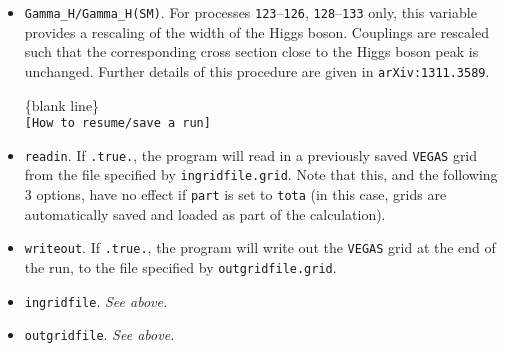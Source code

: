 \documentclass[12pt]{article}
\begin{document}
\begin{itemize}
\item {\tt Gamma\_H/Gamma\_H(SM)}. For processes {\tt 123}--{\tt 126}, {\tt 128}--{\tt 133} only,
this variable provides a rescaling of the width of the Higgs boson.  Couplings are rescaled such that the
corresponding cross section close to the Higgs boson peak is unchanged.  Further details of this procedure are given in
{\tt arXiv:1311.3589}.

\begin{center}
\{blank line\} \\
{\tt [How to resume/save a run] }
\end{center}

\item {\tt readin}. If {\tt .true.}, the program will read in a
previously saved {\tt VEGAS} grid from the file specified by
{\tt ingridfile.grid}. Note that this, and the following 3 options,
have no effect if {\tt part} is set to {\tt tota} (in this case, grids
are automatically saved and loaded as part of the calculation).

\item {\tt writeout}. If {\tt .true.}, the program will write out
the {\tt VEGAS} grid at the end of the run, to the file specified by
{\tt outgridfile.grid}.

\item {\tt ingridfile}.  {\it See above.}

\item {\tt outgridfile}.  {\it See above.}

\end{itemize}
\end{document}
